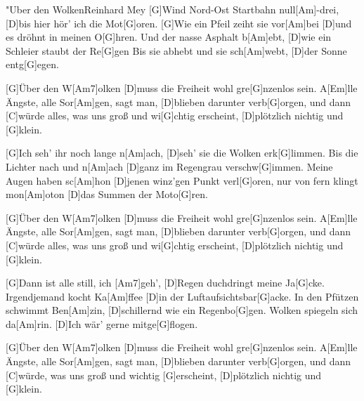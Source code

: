 \documentclass[../main.tex]{subfiles}
\begin{document}
\begin{song}{"Uber den Wolken}{Reinhard Mey}{}
[G]Wind Nord-Ost Startbahn null[Am]-drei, [D]bis hier hör' ich die Mot[G]oren.
[G]Wie ein Pfeil zeiht sie vor[Am]bei [D]und es dröhnt in meinen O[G]hren.
Und der nasse Asphalt b[Am]ebt, [D]wie ein Schleier staubt der Re[G]gen
Bis sie abhebt und sie sch[Am]webt, [D]der Sonne entg[G]egen.

[G]{Ü}ber den W[Am7]olken
[D]muss die Freiheit wohl gre[G]nzenlos sein.
A[Em]lle Ängste, alle Sor[Am]gen, sagt man,
[D]blieben darunter verb[G]orgen, und dann
[C]würde alles, was uns groß und wi[G]chtig erscheint,
[D]plötzlich nichtig und [G]klein.

[G]Ich seh' ihr noch lange n[Am]ach, [D]seh' sie die Wolken erk[G]limmen.
Bis die Lichter nach und n[Am]ach [D]ganz im Regengrau verschw[G]immen.
Meine Augen haben sc[Am]hon [D]jenen winz'gen Punkt verl[G]oren,
nur von fern klingt mon[Am]oton [D]das Summen der Moto[G]ren.

[G]{Ü}ber den W[Am7]olken
[D]muss die Freiheit wohl gre[G]nzenlos sein.
A[Em]lle Ängste, alle Sor[Am]gen, sagt man,
[D]blieben darunter verb[G]orgen, und dann
[C]würde alles, was uns groß und wi[G]chtig erscheint,
[D]plötzlich nichtig und [G]klein.

[G]Dann ist alle still, ich [Am7]geh', [D]Regen duchdringt meine Ja[G]cke.
Irgendjemand kocht Ka[Am]ffee [D]in der Luftaufsichtsbar[G]acke.
In den Pfützen schwimmt Ben[Am]zin, [D]schillernd wie ein Regenbo[G]gen.
Wolken spiegeln sich da[Am]rin. [D]Ich wär' gerne mitge[G]flogen.

[G]{Ü}ber den W[Am7]olken
[D]muss die Freiheit wohl gre[G]nzenlos sein.
A[Em]lle Ängste, alle Sor[Am]gen, sagt man,
[D]blieben darunter verb[G]orgen, und dann
[C]würde, was uns groß und wichtig [G]erscheint,
[D]plötzlich nichtig und [G]klein.
\end{song}
\end{document}
